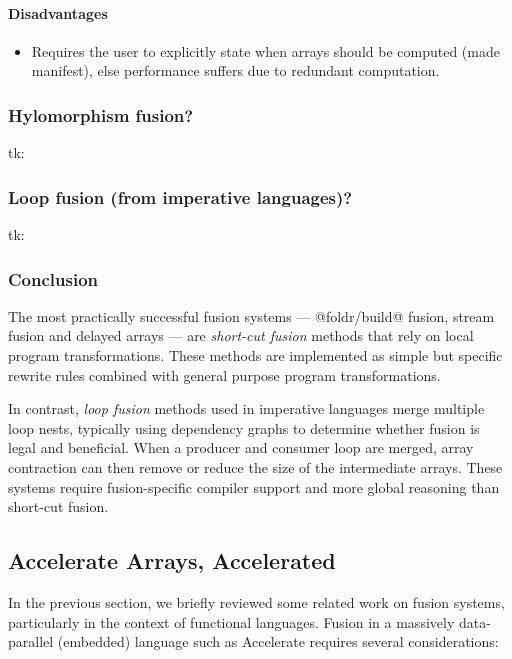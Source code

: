 \paragraph{Disadvantages}
\begin{itemize}
    \item Requires the user to explicitly state when arrays should be computed
        (made manifest), else performance suffers due to redundant computation.
\end{itemize}

\subsubsection{Hylomorphism fusion?}
tk: \citet{Takano:1995}

\subsubsection{Loop fusion (from imperative languages)?}
tk: \citet{Warren:1984ka,Sarkar:1991ff}


\subsubsection{Conclusion}

The most practically successful fusion systems ---
@foldr/build@ fusion, stream
fusion and delayed arrays --- are \emph{short-cut
fusion} methods that rely on local program
transformations. These methods are implemented as simple but specific rewrite
rules combined with general purpose program transformations.

In contrast, \emph{loop fusion} methods used in imperative
languages merge multiple loop nests, typically using dependency
graphs to determine whether fusion is legal and beneficial.
When a producer and consumer loop are merged, array
contraction can then remove or reduce the size of the
intermediate arrays. These systems require fusion-specific compiler support and
more global reasoning than short-cut fusion.


\subsection{Accelerate Arrays, Accelerated}

In the previous section, we briefly reviewed some related work on fusion
systems, particularly in the context of functional languages. Fusion in a
massively data-parallel (embedded) language such as Accelerate requires several
considerations:

